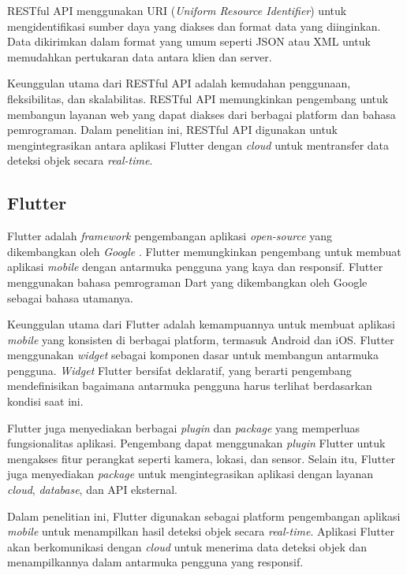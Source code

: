 RESTful API menggunakan URI (\emph{Uniform Resource Identifier}) untuk mengidentifikasi sumber daya yang diakses dan format data yang diinginkan. Data dikirimkan dalam format yang umum seperti JSON atau XML untuk memudahkan pertukaran data antara klien dan server. \parencite*{restapi2016}

Keunggulan utama dari RESTful API adalah kemudahan penggunaan, fleksibilitas, dan skalabilitas. RESTful API memungkinkan pengembang untuk membangun layanan web yang dapat diakses dari berbagai platform dan bahasa pemrograman. Dalam penelitian ini, RESTful API digunakan untuk mengintegrasikan antara aplikasi Flutter dengan \emph{cloud} untuk mentransfer data deteksi objek secara \emph{real-time}.

\subsection{Flutter}

Flutter adalah \emph{framework} pengembangan aplikasi \emph{open-source} yang dikembangkan oleh \emph{Google} \parencite*{google2024}. Flutter memungkinkan pengembang untuk membuat aplikasi \emph{mobile} dengan antarmuka pengguna yang kaya dan responsif. Flutter menggunakan bahasa pemrograman Dart yang dikembangkan oleh Google sebagai bahasa utamanya.

Keunggulan utama dari Flutter adalah kemampuannya untuk membuat aplikasi \emph{mobile} yang konsisten di berbagai platform, termasuk Android dan iOS. Flutter menggunakan \emph{widget} sebagai komponen dasar untuk membangun antarmuka pengguna. \emph{Widget} Flutter bersifat deklaratif, yang berarti pengembang mendefinisikan bagaimana antarmuka pengguna harus terlihat berdasarkan kondisi saat ini.

Flutter juga menyediakan berbagai \emph{plugin} dan \emph{package} yang memperluas fungsionalitas aplikasi. Pengembang dapat menggunakan \emph{plugin} Flutter untuk mengakses fitur perangkat seperti kamera, lokasi, dan sensor. Selain itu, Flutter juga menyediakan \emph{package} untuk mengintegrasikan aplikasi dengan layanan \emph{cloud}, \emph{database}, dan API eksternal.

Dalam penelitian ini, Flutter digunakan sebagai platform pengembangan aplikasi \emph{mobile} untuk menampilkan hasil deteksi objek secara \emph{real-time}. Aplikasi Flutter akan berkomunikasi dengan \emph{cloud} untuk menerima data deteksi objek dan menampilkannya dalam antarmuka pengguna yang responsif.


